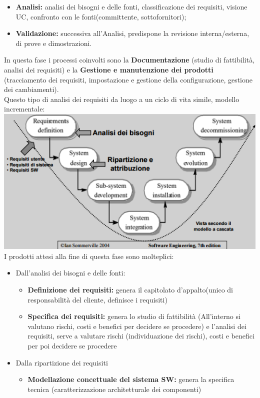 \begin{itemize}

	\item \textbf{Analisi:} analisi dei bisogni e delle fonti, classificazione dei requisiti, visione UC, confronto con le fonti(committente, sottofornitori);
	\item \textbf{Validazione:} successiva all'Analisi, predispone la revisione interna/esterna, di prove e dimostrazioni.

\end{itemize}

In questa fase i processi coinvolti sono la \textbf{Documentazione} (studio di fattibilità, analisi dei requisiti) e la \textbf{Gestione e manutenzione dei prodotti} (tracciamento dei requisiti, impostazione e gestione della configurazione, gestione dei cambiamenti).\\
Questo tipo di analisi dei requisiti da luogo a un ciclo di vita simile, modello incrementale:\\
\includegraphics[width=0.75\columnwidth]{img1}
\\
I prodotti attesi alla fine di questa fase sono molteplici:

\begin{itemize}
	\item Dall'analisi dei bisogni e delle fonti:
	\begin{itemize}
		\item \textbf{Definizione dei requisiti:} genera il capitolato d'appalto(unico di responsabilità del cliente, definisce i requisiti)
		\item \textbf{Specifica dei requisiti:} genera lo studio di fattibilità (All'interno si valutano rischi, costi e benefici per decidere se procedere) e l'analisi dei requisiti, serve a valutare rischi (individuazione dei rischi), costi e benefici per poi decidere se procedere
	\end{itemize}
	\item Dalla ripartizione dei requisiti
	\begin{itemize}
		\item \textbf{Modellazione concettuale del sistema SW:} genera la specifica tecnica (caratterizzazione architetturale dei componenti)
	\end{itemize}
\end{itemize}

